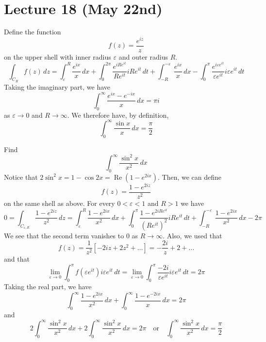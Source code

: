 \section{Lecture 18 (May 22nd)}
\begin{ex}
Define the function
\[f(z)=\dfrac{e^{iz}}{z}\]
on the upper shell with inner radius $\varepsilon $ and outer radius $R$.
\[\int _{C_{R}}f(z)\,dz=\int ^{R}_{\varepsilon }\dfrac{e^{ix}}{x}\,dx+\int ^{2\pi }_{0}\dfrac{e^{iRe^{it}}}{Re^{it}}iRe^{it}\,dt+\int ^{-\varepsilon }_{-R}\dfrac{e^{ix}}{x}\,dx-\int ^{\pi }_{0}\dfrac{e^{i\varepsilon e^{it}}}{\varepsilon e^{it}}i\varepsilon e^{it}\,dt\]
Taking the imaginary part, we have
\[\int ^{\infty }_{0}\dfrac{e^{ix}-e^{-ix}}{x}\,dx=\pi i\]
as $\varepsilon \rightarrow 0$ and $R\rightarrow \infty $. We therefore have, by definition,
\[\int ^{\infty }_{0}\dfrac{\sin x}{x}\,dx=\dfrac{\pi }{2}\]
\end{ex}
\vspace{2ex}
\begin{ex}
Find
\[\int ^{\infty }_{0}\dfrac{\sin ^2x}{x^2}\,dx\]
Notice that $2\sin ^2x=1-\cos 2x=\mathop{\mathrm{Re}}(1-e^{2ix})$. Then, we can define
\[f(z)=\dfrac{1-e^{2iz}}{z^2}\]
on the same shell as above. For every $0<\varepsilon <1$ and $R>1$ we have
\[0=\int _{C_{\varepsilon ,R}}\dfrac{1-e^{2iz}}{z^2}\,dz=\int ^{R}_{\varepsilon }\dfrac{1-e^{2ix}}{x^2}\,dx+\int ^{\pi }_{0}\dfrac{1-e^{2iRe^{it}}}{(Re^{it})^2}iRe^{it}\,dt+\int ^{-\varepsilon }_{-R}\dfrac{1-e^{2ix}}{x^2}\,dx-2\pi \]
We see that the second term vanishes to 0 as $R\rightarrow \infty $. Also, we used that
\[f(z)=\dfrac{1}{z^2}[-2iz+2z^2+\ldots ]=-\dfrac{2i}{z}+2+\ldots \]
and that
\[\lim _{\varepsilon \rightarrow 0}\int ^{\pi }_{0}f(\varepsilon e^{it})i\varepsilon e^{it}\,dt=\lim _{\varepsilon \rightarrow 0}\int ^{\pi }_{0}\dfrac{-2i}{\varepsilon e^{it}}i\varepsilon e^{it}\,dt=2\pi \]
Taking the real part, we have
\[\int ^{\infty }_{0}\dfrac{1-e^{2ix}}{x^2}\,dx+\int ^{\infty }_{0}\dfrac{1-e^{-2ix}}{x}\,dx=2\pi \]
and
\[2\int ^{\infty }_{0}\dfrac{\sin ^2x}{x^2}\,dx+2\int ^{\infty }_{0}\dfrac{\sin ^2x}{x^2}\,dx=2\pi \quad \mathrm{or}\quad \int ^{\infty }_{0}\dfrac{\sin ^2x}{x^2}\,dx=\dfrac{\pi }{2}\]
\end{ex}
\vspace{2ex}
